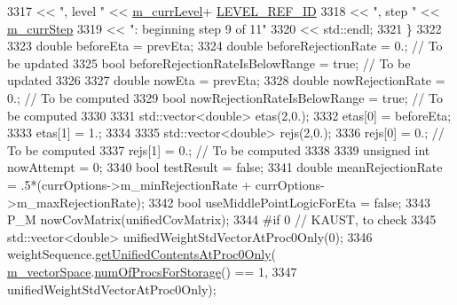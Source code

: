 \begin{DoxyCode}
3317                                 << \textcolor{stringliteral}{", level "} << \hyperlink{class_q_u_e_s_o_1_1_m_l_sampling_af9416874c856e50f3b35270e801f17e4}{m\_currLevel}+
      \hyperlink{_m_l_sampling_level_options_8h_a68d15eaf394d210effcf584b938206d3}{LEVEL\_REF\_ID}
3318                                 << \textcolor{stringliteral}{", step "}  << \hyperlink{class_q_u_e_s_o_1_1_m_l_sampling_a1b1f8ccb4823bdfa26ec652f0807c63e}{m\_currStep}
3319                                 << \textcolor{stringliteral}{": beginning step 9 of 11"}
3320                                 << std::endl;
3321       \}
3322 
3323       \textcolor{keywordtype}{double} beforeEta           = prevEta;
3324       \textcolor{keywordtype}{double} beforeRejectionRate = 0.;               \textcolor{comment}{// To be updated}
3325       \textcolor{keywordtype}{bool}   beforeRejectionRateIsBelowRange = \textcolor{keyword}{true}; \textcolor{comment}{// To be updated}
3326 
3327       \textcolor{keywordtype}{double} nowEta           = prevEta;
3328       \textcolor{keywordtype}{double} nowRejectionRate = 0.;               \textcolor{comment}{// To be computed}
3329       \textcolor{keywordtype}{bool}   nowRejectionRateIsBelowRange = \textcolor{keyword}{true}; \textcolor{comment}{// To be computed}
3330 
3331       std::vector<double> etas(2,0.);
3332       etas[0] = beforeEta;
3333       etas[1] = 1.;
3334 
3335       std::vector<double> rejs(2,0.);
3336       rejs[0] = 0.; \textcolor{comment}{// To be computed}
3337       rejs[1] = 0.; \textcolor{comment}{// To be computed}
3338 
3339       \textcolor{keywordtype}{unsigned} \textcolor{keywordtype}{int} nowAttempt = 0;
3340       \textcolor{keywordtype}{bool} testResult = \textcolor{keyword}{false};
3341       \textcolor{keywordtype}{double} meanRejectionRate = .5*(currOptions->m\_minRejectionRate + currOptions->m\_maxRejectionRate);
3342       \textcolor{keywordtype}{bool} useMiddlePointLogicForEta = \textcolor{keyword}{false};
3343       P\_M nowCovMatrix(unifiedCovMatrix);
3344 \textcolor{preprocessor}{#if 0 // KAUST, to check}
3345 \textcolor{preprocessor}{}      std::vector<double> unifiedWeightStdVectorAtProc0Only(0);
3346       weightSequence.\hyperlink{class_q_u_e_s_o_1_1_scalar_sequence_ab8802412461496eb72f6c1267507c28c}{getUnifiedContentsAtProc0Only}(
      \hyperlink{class_q_u_e_s_o_1_1_m_l_sampling_a7bc4c72f65ba9166ed94a6e198b0915b}{m\_vectorSpace}.\hyperlink{class_q_u_e_s_o_1_1_vector_space_a67b0c3620662116f5a346fdaa5faf38e}{numOfProcsForStorage}() == 1,
3347                                                    unifiedWeightStdVectorAtProc0Only);

\end{DoxyCode}
